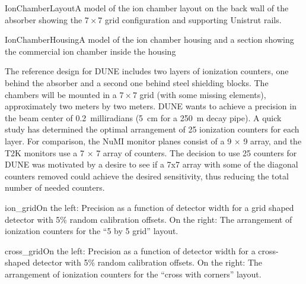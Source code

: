 \begin{cdrfigure}{IonChamberLayout}{A model of the ion chamber layout on the back wall of the absorber
showing the $7\times 7$ grid configuration and supporting Unistrut rails.}

\end{cdrfigure}

\begin{cdrfigure}{IonChamberHousing}{A model of the ion chamber housing and a section showing the commercial ion chamber inside the housing}
\end{cdrfigure}

The reference design for DUNE includes two layers of ionization counters, one 
behind the absorber and a second one behind steel shielding blocks. The chambers
will be mounted in a $7 \times 7$ grid (with some missing elements), approximately two meters by two meters. 
DUNE wants to achieve a precision in the beam center of 0.2~milliradians
(5~cm for a 250~m decay pipe). A quick study has 
determined the optimal arrangement of 25 ionization counters for each layer. 
For comparison, the NuMI monitor planes consist of a 
9 $\times$ 9 array, and the T2K monitors use a 7 $\times$ 7 array of counters. 
The decision to use 25 counters for DUNE was motivated by a desire to see if a 7x7 array with some of the diagonal counters removed could achieve the desired sensitivity, thus reducing the total number of needed counters.

\begin{cdrfigure}{ion_grid}{On the left: Precision as a function of detector width for a grid 
shaped detector with 5\% random calibration offsets. On the right: The 
arrangement of ionization counters for the ``5 by 5 grid'' layout.}
\end{cdrfigure}

\begin{cdrfigure}{cross_grid}{On the left: Precision as a function of detector width for a cross-shaped detector 
with 5\% random calibration offsets. On the right: The 
arrangement of ionization counters for the ``cross with corners'' layout.}
\end{cdrfigure}

